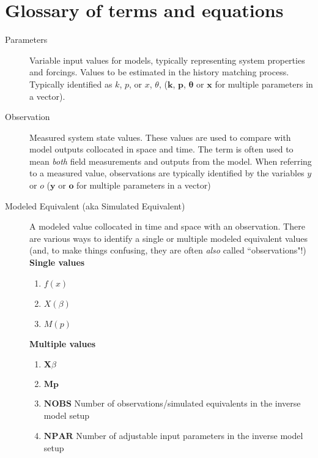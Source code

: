 \documentclass[english]{article}
\begin{document}
\section*{Glossary of terms and equations}
\begin{description}
\item [Parameters] Variable input values for models, typically representing system properties and forcings. Values to be estimated in the history matching process. Typically identified as $k$, $p$, or $x$, $\theta$, ($\mathbf{k}$, $\mathbf{p}$, $\boldsymbol{\theta}$ or $\mathbf{x}$ for multiple parameters in a vector).
\item [Observation] Measured system state values. These values are used to compare with model outputs collocated in space and time. The term is often used to mean \emph{both} field measurements and outputs from the model. When referring to a measured value, observations are typically identified by the variables $y$ or $o$  ($\mathbf{y}$ or $\mathbf{o}$ for multiple parameters in a vector)
\item [Modeled Equivalent (aka Simulated Equivalent)] A modeled value collocated in time and space with an observation. There are various ways to identify a single or multiple modeled equivalent values (and, to make things confusing, they are often \emph{also} called ``observations"!)  \newline{}
\textbf{Single values} 
\begin{enumerate}
\item $f\left(x\right)$
\item $X\left(\beta\right)$
\item $M\left(p\right)$
\end{enumerate}
\textbf{Multiple values}
\begin{enumerate}
\item $\mathbf{X}\beta$
\item $\mathbf{M}\mathbf{p}$
\item $\mathbf{NOBS}$ Number of observations/simulated equivalents in the inverse model setup
\item $\mathbf{NPAR}$ Number of adjustable input parameters in the inverse model setup


\end{enumerate}
\end{description}
\end{document}
